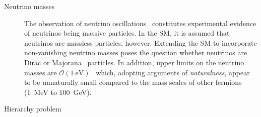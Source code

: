 \begin{description}
\item[Neutrino masses] The observation of neutrino
  oscillations~\cite{Super-Kamiokande:1998kpq,SNO:2002tuh} constitutes
  experimental evidence of neutrinos being massive particles. In the SM, it is
  assumed that neutrinos are massless particles, however. Extending the SM to
  incorporate non-vanishing neutrino masses poses the question whether neutrinos
  are Dirac or Majorana~\cite{Majorana:1937vz} particles. In addition, upper
  limits on the neutrino masses are
  $\mathcal{O}(\SI{1}{\electronvolt})$~\cite{pdg2020} which, adopting arguments
  of \emph{naturalness}, appear to be unnaturally small compared to the mass
  scales of other fermions (\SI{1}{\MeV} to \SI{100}{\GeV}).






\item[Hierarchy problem]





\end{description}
